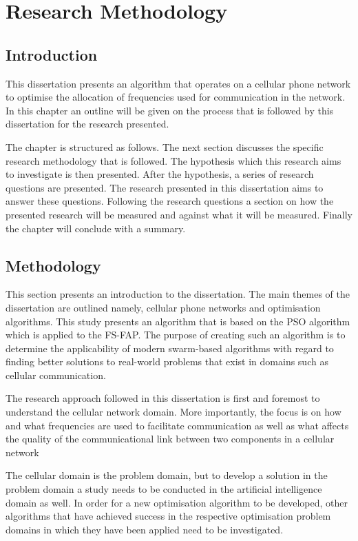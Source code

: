 \chapter{Research Methodology}
\section{Introduction}
This dissertation presents an algorithm that operates on a cellular phone network to optimise the allocation of frequencies used for communication in the network. In this chapter an outline will be given on the process that is followed by this dissertation for the research presented.

The chapter is structured as follows. The next section discusses the specific research methodology that is followed. The hypothesis which this research aims to investigate is then presented. After the hypothesis, a series of research questions are presented. The research presented in this dissertation aims to answer these questions.
Following the research questions a section on how the presented research will be measured and against what it will be measured. Finally the chapter will conclude with a summary.
\section{Methodology}
This section presents an introduction to the dissertation. The main themes of the dissertation are outlined namely, cellular phone networks and optimisation algorithms. 
This study presents an algorithm that is based on the \gls{PSO} algorithm which is applied to the \gls{FS-FAP}. The purpose of creating such an algorithm is to determine the applicability of modern swarm-based algorithms with regard to finding better solutions to real-world problems that exist in domains such as cellular communication.

The research approach followed in this dissertation is first and foremost to understand the cellular network domain. More importantly, the focus is on how and what frequencies are used to facilitate communication as well as what affects the quality of the communicational link between two components in a cellular network 

The cellular domain is the problem domain, but to develop a solution in the problem domain a study needs to be conducted in the artificial intelligence domain as well. In order for a new optimisation algorithm to be developed, other algorithms that have achieved success in the respective optimisation problem domains in which they have been applied need to be investigated.


